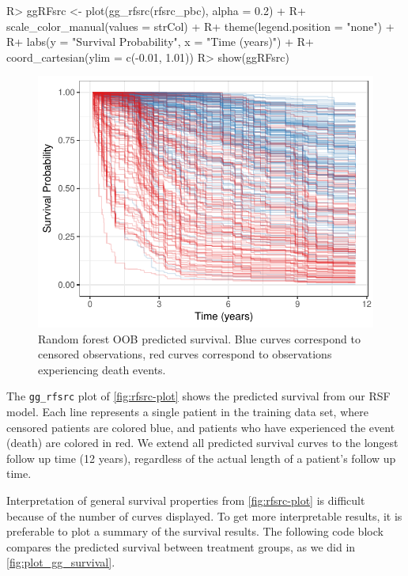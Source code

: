 \documentclass[article]{jss}
\begin{document}
\begin{Schunk}
\begin{Sinput}
R> ggRFsrc <- plot(gg_rfsrc(rfsrc_pbc), alpha = 0.2) +
R+   scale_color_manual(values = strCol) +
R+   theme(legend.position = "none") +
R+   labs(y = "Survival Probability", x = "Time (years)") +
R+   coord_cartesian(ylim = c(-0.01, 1.01))
R> show(ggRFsrc)
\end{Sinput}
\begin{figure}[!htb]

{\centering \includegraphics{rfs-rfsrc-plot-1} 

}

\caption[Random forest OOB predicted survival]{Random forest OOB predicted survival. Blue curves correspond to censored observations, red curves correspond to observations experiencing death events.}\label{fig:rfsrc-plot}
\end{figure}
\end{Schunk}

The \texttt{gg\_rfsrc} plot of \autoref{fig:rfsrc-plot} shows the
predicted survival from our RSF model. Each line represents a single
patient in the training data set, where censored patients are colored
blue, and patients who have experienced the event (death) are colored in
red. We extend all predicted survival curves to the longest follow up
time (12 years), regardless of the actual length of a patient's follow
up time.

Interpretation of general survival properties from
\autoref{fig:rfsrc-plot} is difficult because of the number of curves
displayed. To get more interpretable results, it is preferable to plot a
summary of the survival results. The following code block compares the
predicted survival between treatment groups, as we did in
\autoref{fig:plot_gg_survival}.
\end{document}
